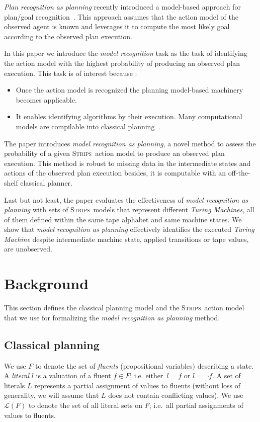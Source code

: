 \documentclass[letterpaper]{article} %
\newcommand{\strips}{\textsc{Strips}}     %
\begin{document}
{\em Plan recognition as planning} recently introduced a model-based approach for plan/goal recognition~\cite{ramirez2012plan,ramirez2009plan}. This approach assumes that the action model of the observed agent is known and leverages it to compute the most likely goal according to the observed plan execution.

In this paper we introduce the {\em model recognition} task as the task of identifying the action model with the highest probability of producing an observed plan execution. This task is of interest because :
\begin{itemize}
\item Once the action model is recognized the planning model-based machinery~\cite{ghallab2004automated,geffner:book:2013} becomes applicable.
\item It enables identifying algorithms by their execution. Many computational models are compilable into classical planning~\cite{baier2007exploiting,Geffner:FSM:AAAI10,segovia2016hierarchical}.    
\end{itemize}

The paper introduces {\em model recognition as planning}, a novel method to assess the probability of a given \strips\ action model to produce an observed plan execution. This method is robust to missing data in the intermediate states and actions of the observed plan execution besides, it is computable with an off-the-shelf classical planner.

Last but not least, the paper evaluates the effectiveness of {\em model recognition as planning} with sets of \strips\ models that represent different {\em Turing Machines}, all of them defined within the same tape alphabet and same machine states. We show that {\em model recognition as planning} effectively identifies the executed {\em Turing Machine} despite intermediate machine state, applied transitions or tape values, are unobserved.


\section{Background}
\label{sec:background}
This section defines the classical planning model and the \strips\ action model that we use for formalizing the {\em model recognition as planning} method.

\subsection{Classical planning}
We use $F$ to denote the set of {\em fluents} (propositional variables) describing a state. A {\em literal} $l$ is a valuation of a fluent $f\in F$; i.e. either~$l=f$ or $l=\neg f$. A set of literals $L$ represents a partial assignment of values to fluents (without loss of generality, we will assume that $L$ does not contain conflicting values). We use $\mathcal{L}(F)$ to denote the set of all literal sets on $F$; i.e.~all partial assignments of values to fluents.
\end{document}
